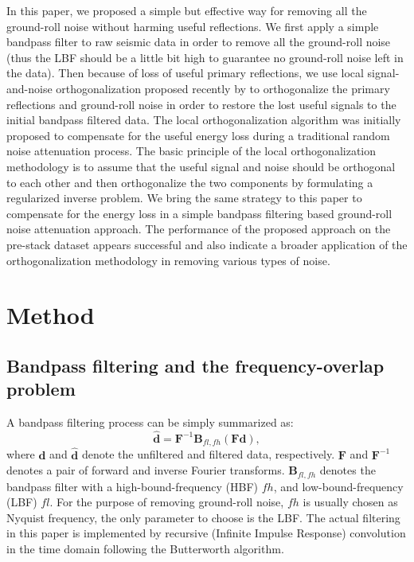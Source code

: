 In this paper, we proposed a simple but effective way for removing all the ground-roll noise without harming useful reflections. We first apply a simple bandpass filter to raw seismic data in order to remove all the ground-roll noise (thus the LBF should be a little bit high to guarantee no ground-roll noise left in the data). Then because of loss of useful primary reflections, we use local signal-and-noise orthogonalization proposed recently by \cite{yangkang2015ortho} to orthogonalize the primary reflections and ground-roll noise in order to restore the lost useful signals to the initial bandpass filtered data. The local orthogonalization algorithm was initially proposed to compensate for the useful energy loss during a traditional random noise attenuation process. The basic principle of the local orthogonalization methodology is to assume that the useful signal and noise should be orthogonal to each other and then orthogonalize the two components by formulating a regularized inverse problem. We bring the same strategy to this paper to compensate for the energy loss in a simple bandpass filtering based ground-roll noise attenuation approach. The performance of the proposed approach on the pre-stack dataset appears successful and also indicate a broader application of the orthogonalization methodology in removing various types of noise.    

\section{Method}
\subsection{Bandpass filtering and the frequency-overlap problem}
A bandpass filtering process can be simply summarized as:
\begin{equation}
\label{eq:bandpass}
\mathbf{\hat{d}} = \mathbf{F}^{-1} \mathbf{B}_{fl,fh} \left(\mathbf{F} \mathbf{d}\right),
\end{equation}
where $\mathbf{d}$ and $\mathbf{\hat{d}}$ denote the unfiltered and filtered data, respectively. $\mathbf{F}$  and $\mathbf{F}^{-1}$ denotes a pair of forward and inverse Fourier transforms. $\mathbf{B}_{fl,fh}$ denotes the bandpass filter with a high-bound-frequency (HBF) $fh$, and low-bound-frequency (LBF) $fl$. For the purpose of removing ground-roll noise, $fh$ is usually chosen as Nyquist frequency, the only parameter to choose is the LBF. The actual filtering in this paper is implemented by recursive  (Infinite Impulse Response) convolution in the time domain following the Butterworth algorithm.

